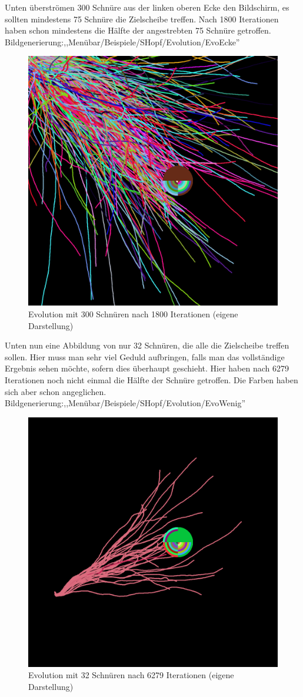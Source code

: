 \documentclass[../mciAusarbeitung.tex]{subfiles}
\begin{document}
		\noindent Unten überströmen 300 Schnüre aus der linken oberen Ecke den Bildschirm, es sollten mindestens 75 Schnüre die Zielscheibe treffen. Nach 1800 Iterationen haben schon mindestens die Hälfte der angestrebten 75 Schnüre getroffen.\\
		Bildgenerierung:,,Menübar/Beispiele/SHopf/Evolution/EvoEcke''\\
		\begin{figure}[H]
			\centering
			\includegraphics[width=0.5\linewidth]{img/evoEcke.png}
			\caption[EvoEcke]{Evolution mit 300 Schnüren nach 1800 Iterationen (eigene Darstellung)}
		\end{figure} 
		\noindent Unten nun eine Abbildung von nur 32 Schnüren, die alle die Zielscheibe treffen sollen. Hier muss man sehr viel Geduld aufbringen, falls man das vollständige Ergebnis sehen möchte, sofern dies überhaupt geschieht. Hier haben nach 6279 Iterationen noch nicht einmal die Hälfte der Schnüre getroffen. Die Farben haben sich aber schon angeglichen.\\
		Bildgenerierung:,,Menübar/Beispiele/SHopf/Evolution/EvoWenig''\\
		\begin{figure}[H]
			\centering
			\includegraphics[width=0.5\linewidth]{img/evoWenig.png}
			\caption[EvoWenig]{Evolution mit 32 Schnüren nach 6279 Iterationen (eigene Darstellung)}
		\end{figure} 
				
\end{document}
